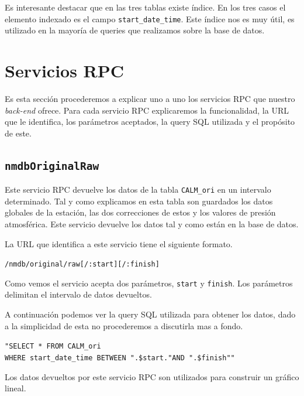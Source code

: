 	\par 
	Es interesante destacar que en las tres tablas existe índice. En los tres casos el elemento indexado es el campo \texttt{start\_date\_time}.
	Este índice nos es muy útil, es utilizado en la mayoría de queries que realizamos sobre la base de datos. 
\section{Servicios RPC}
	Es esta sección procederemos a explicar uno a uno los servicios RPC que nuestro \emph{back-end} ofrece. Para cada servicio RPC explicaremos la
	funcionalidad, la URL que le identifica, los parámetros aceptados, la query SQL utilizada y el propósito de este.
	\subsection{\texttt{nmdbOriginalRaw}}
		Este servicio RPC devuelve los datos de la tabla \texttt{CALM\_ori} en un intervalo determinado. Tal y como explicamos en esta
		tabla son guardados los datos globales de la estación, las dos correcciones de estos y los valores de presión atmosférica. Este servicio
		devuelve los datos tal y como están en la base de datos. 
	  	\par
	  	La URL que identifica a este servicio tiene el siguiente formato.
	  		\begin{center} \texttt{/nmdb/original/raw[/:start][/:finish]}  \end{center} 
		Como vemos el servicio acepta dos parámetros, \texttt{start} y \texttt{finish}. Los parámetros delimitan el intervalo de datos
		devueltos.
		\par
		A continuación podemos ver la query SQL utilizada para obtener los datos, dado a la simplicidad de esta no procederemos a discutirla
		mas a fondo.
	  		\begin{center} \texttt{"SELECT * FROM CALM\_ori 
			  		\\	WHERE start\_date\_time BETWEEN \cc".\$start."\cc AND \cc".\$finish"\cc"}
			\end{center} 
		Los datos devueltos por este servicio RPC son utilizados para construir un gráfico lineal.

